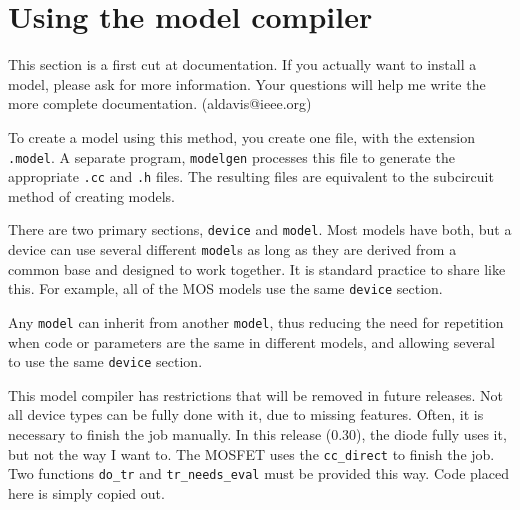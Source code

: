 %
%
%
%
\section{Using the model compiler}

This section is a first cut at documentation.  If you actually want to
install a model, please ask for more information.  Your questions will
help me write the more complete documentation.  (aldavis@ieee.org)

To create a model using this method, you create one file, with the
extension {\tt .model}.  A separate program, {\tt modelgen} processes
this file to generate the appropriate {\tt .cc} and {\tt .h} files.
The resulting files are equivalent to the subcircuit method of
creating models.

There are two primary sections, {\tt device} and {\tt model}.  Most
models have both, but a device can use several different {\tt model}s
as long as they are derived from a common base and designed to work
together.  It is standard practice to share like this.  For example,
all of the MOS models use the same {\tt device} section.

Any {\tt model} can inherit from another {\tt model}, thus reducing
the need for repetition when code or parameters are the same in
different models, and allowing several to use the same {\tt device}
section.

This model compiler has restrictions that will be removed in future
releases.  Not all device types can be fully done with it, due to
missing features.  Often, it is necessary to finish the job manually.
In this release (0.30), the diode fully uses it, but not the way I
want to.  The MOSFET uses the {\tt cc\_direct} to finish the job.  Two
functions {\tt do\_tr} and {\tt tr\_needs\_eval} must be provided this
way.  Code placed here is simply copied out.


